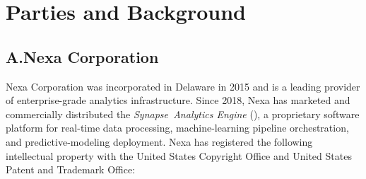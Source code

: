 
\section{Parties and Background}

\subsection*{A.\quad Nexa Corporation}

Nexa Corporation was incorporated in Delaware in 2015 and is a leading provider
of enterprise-grade analytics infrastructure. Since 2018, Nexa has marketed and
commercially distributed the \textit{Synapse\texttrademark\ Analytics Engine}
(), a proprietary software platform for real-time data
processing, machine-learning pipeline orchestration, and predictive-modeling
deployment. Nexa has registered the following intellectual property with the
United States Copyright Office and United States Patent and Trademark Office:

\vspace{8pt}

\begin{center}
\end{center}

\vspace{6pt}

